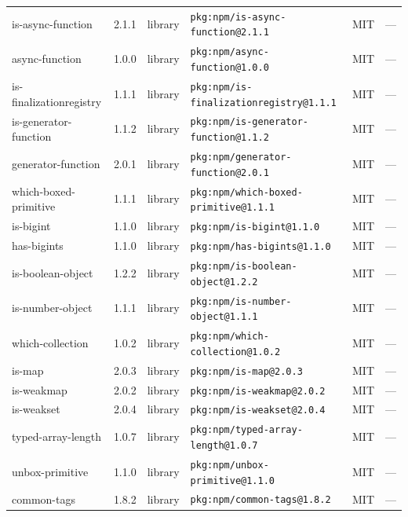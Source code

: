 \documentclass[11pt,a4paper]{article}
\begin{document}
\begin{longtable}{|p{4cm}|p{2cm}|p{1.6cm}|p{5cm}|p{1.5cm}|p{3.5cm}|}
\raggedright is-async-function & 2.1.1 & library & \small\texttt{pkg:npm/is-async-function@2.1.1} & MIT & \small — \\
\raggedright async-function & 1.0.0 & library & \small\texttt{pkg:npm/async-function@1.0.0} & MIT & \small — \\
\raggedright is-finalizationregistry & 1.1.1 & library & \small\texttt{pkg:npm/is-finalizationregistry@1.1.1} & MIT & \small — \\
\raggedright is-generator-function & 1.1.2 & library & \small\texttt{pkg:npm/is-generator-function@1.1.2} & MIT & \small — \\
\raggedright generator-function & 2.0.1 & library & \small\texttt{pkg:npm/generator-function@2.0.1} & MIT & \small — \\
\raggedright which-boxed-primitive & 1.1.1 & library & \small\texttt{pkg:npm/which-boxed-primitive@1.1.1} & MIT & \small — \\
\raggedright is-bigint & 1.1.0 & library & \small\texttt{pkg:npm/is-bigint@1.1.0} & MIT & \small — \\
\raggedright has-bigints & 1.1.0 & library & \small\texttt{pkg:npm/has-bigints@1.1.0} & MIT & \small — \\
\raggedright is-boolean-object & 1.2.2 & library & \small\texttt{pkg:npm/is-boolean-object@1.2.2} & MIT & \small — \\
\raggedright is-number-object & 1.1.1 & library & \small\texttt{pkg:npm/is-number-object@1.1.1} & MIT & \small — \\
\raggedright which-collection & 1.0.2 & library & \small\texttt{pkg:npm/which-collection@1.0.2} & MIT & \small — \\
\raggedright is-map & 2.0.3 & library & \small\texttt{pkg:npm/is-map@2.0.3} & MIT & \small — \\
\raggedright is-weakmap & 2.0.2 & library & \small\texttt{pkg:npm/is-weakmap@2.0.2} & MIT & \small — \\
\raggedright is-weakset & 2.0.4 & library & \small\texttt{pkg:npm/is-weakset@2.0.4} & MIT & \small — \\
\raggedright typed-array-length & 1.0.7 & library & \small\texttt{pkg:npm/typed-array-length@1.0.7} & MIT & \small — \\
\raggedright unbox-primitive & 1.1.0 & library & \small\texttt{pkg:npm/unbox-primitive@1.1.0} & MIT & \small — \\
\raggedright common-tags & 1.8.2 & library & \small\texttt{pkg:npm/common-tags@1.8.2} & MIT & \small — \\

\end{longtable}
\end{document}
